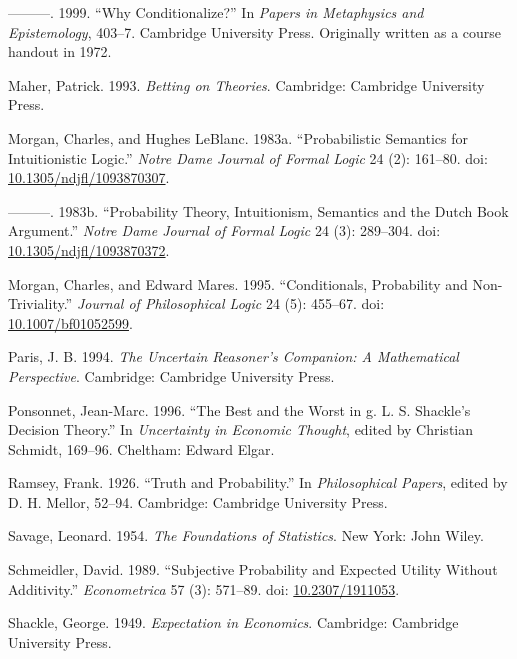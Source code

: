 \documentclass[
  10pt,
  letterpaper,
  DIV=11,
  numbers=noendperiod,
  twoside]{scrartcl}
\newlength{\cslhangindent}
\newenvironment{CSLReferences}[2] %
 {\begin{list}{}{%
  \setlength{\itemindent}{0pt}
  \setlength{\leftmargin}{0pt}
  \setlength{\parsep}{0pt}
  \ifodd #1
   \setlength{\leftmargin}{\cslhangindent}
   \setlength{\itemindent}{-1\cslhangindent}
  \fi
  \setlength{\itemsep}{#2\baselineskip}}}
 {\end{list}}
\begin{document}
\begin{CSLReferences}{1}{0}
---------. 1999. {``Why Conditionalize?''} In \emph{Papers in
Metaphysics and Epistemology}, 403--7. Cambridge University Press.
Originally written as a course handout in 1972.

Maher, Patrick. 1993. \emph{Betting on Theories}. Cambridge: Cambridge
University Press.

Morgan, Charles, and Hughes LeBlanc. 1983a. {``Probabilistic Semantics
for Intuitionistic Logic.''} \emph{Notre Dame Journal of Formal Logic}
24 (2): 161--80. doi:
\href{https://doi.org/10.1305/ndjfl/1093870307}{10.1305/ndjfl/1093870307}.

---------. 1983b. {``Probability Theory, Intuitionism, Semantics and the
Dutch Book Argument.''} \emph{Notre Dame Journal of Formal Logic} 24
(3): 289--304. doi:
\href{https://doi.org/10.1305/ndjfl/1093870372}{10.1305/ndjfl/1093870372}.

Morgan, Charles, and Edward Mares. 1995. {``Conditionals, Probability
and Non-Triviality.''} \emph{Journal of Philosophical Logic} 24 (5):
455--67. doi:
\href{https://doi.org/10.1007/bf01052599}{10.1007/bf01052599}.

Paris, J. B. 1994. \emph{The Uncertain Reasoner's Companion: A
Mathematical Perspective}. Cambridge: Cambridge University Press.

Ponsonnet, Jean-Marc. 1996. {``The Best and the Worst in g. L. S.
Shackle's Decision Theory.''} In \emph{Uncertainty in Economic Thought},
edited by Christian Schmidt, 169--96. Cheltham: Edward Elgar.

Ramsey, Frank. 1926. {``Truth and Probability.''} In \emph{Philosophical
Papers}, edited by D. H. Mellor, 52--94. Cambridge: Cambridge University
Press.

Savage, Leonard. 1954. \emph{The Foundations of Statistics}. New York:
John Wiley.

Schmeidler, David. 1989. {``Subjective Probability and Expected Utility
Without Additivity.''} \emph{Econometrica} 57 (3): 571--89. doi:
\href{https://doi.org/10.2307/1911053}{10.2307/1911053}.

Shackle, George. 1949. \emph{Expectation in Economics}. Cambridge:
Cambridge University Press.


\end{CSLReferences}
\end{document}

